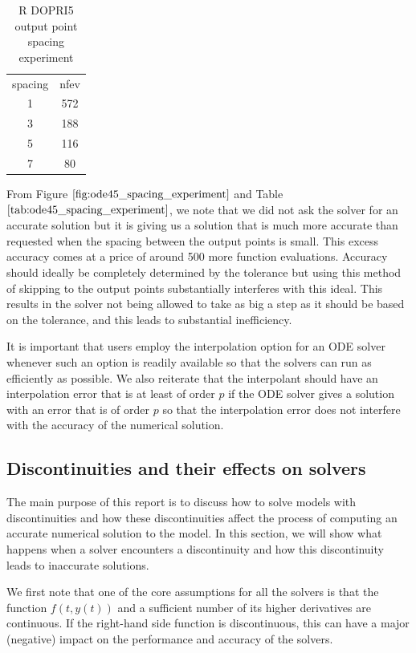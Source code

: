 \begin{table}[h]
\caption {R DOPRI5 output point spacing experiment} \label{tab:ode45_spacing_experiment} 
\begin{center}
\begin{tabular}{ c c }
spacing & nfev \\ 
1 & 572 \\
3 & 188 \\
5 & 116 \\
7 & 80 \\
\end{tabular}
\end{center}
\end{table}

From Figure $\ref{fig:ode45_spacing_experiment}$ and Table $\ref{tab:ode45_spacing_experiment}$, we note that we did not ask the solver for an accurate solution but it is giving us a solution that is much more accurate than requested when the spacing between the output points is small. This excess accuracy comes at a price of around 500 more function evaluations. Accuracy should ideally be completely determined by the tolerance but using this method of skipping to the output points substantially interferes with this ideal. This results in the solver not being allowed to take as big a step as it should be based on the tolerance, and this leads to substantial inefficiency. 

It is important that users employ the interpolation option for an ODE solver whenever such an option is readily available so that the solvers can run as efficiently as possible. We also reiterate that the interpolant should have an interpolation error that is at least of order $p$ if the ODE solver gives a solution with an error that is of order $p$ so that the interpolation error does not interfere with the accuracy of the numerical solution.

\subsection{Discontinuities and their effects on solvers}
\label{subsection:effect_of_discontinuity}
The main purpose of this report is to discuss how to solve models with discontinuities and how these discontinuities affect the process of computing an accurate numerical solution to the model. In this section, we will show what happens when a solver encounters a discontinuity and how this discontinuity leads to inaccurate solutions.

We first note that one of the core assumptions for all the solvers is that the function $f(t, y(t))$ and a sufficient number of its higher derivatives are continuous. If the right-hand side function is discontinuous, this can have a major (negative) impact on the performance and accuracy of the solvers. 

